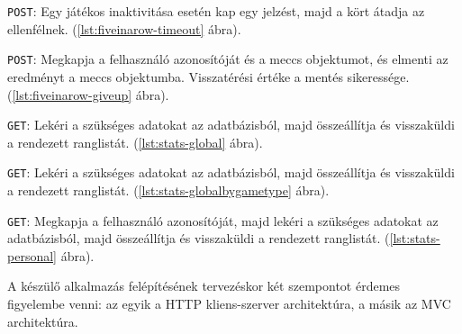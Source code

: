 \texttt{POST}: Egy játékos inaktivitása esetén kap egy jelzést, majd a kört átadja az ellenfélnek. (\ref{lst:fiveinarow-timeout} ábra).



\texttt{POST}: Megkapja a felhasználó azonosítóját és a meccs objektumot, és elmenti az eredményt a meccs objektumba. Visszatérési értéke a mentés sikeressége. (\ref{lst:fiveinarow-giveup} ábra).












\texttt{GET}: Lekéri a szükséges adatokat az adatbázisból, majd összeállítja és visszaküldi a rendezett ranglistát. (\ref{lst:stats-global} ábra).



\texttt{GET}: Lekéri a szükséges adatokat az adatbázisból, majd összeállítja és visszaküldi a rendezett ranglistát. (\ref{lst:stats-globalbygametype} ábra).



\texttt{GET}: Megkapja a felhasználó azonosítóját, majd lekéri a szükséges adatokat az adatbázisból, majd összeállítja és visszaküldi a rendezett ranglistát. (\ref{lst:stats-personal} ábra).





A készülő alkalmazás felépítésének tervezéskor két szempontot érdemes figyelembe venni: az egyik a HTTP kliens-szerver architektúra, a másik az MVC architektúra.

